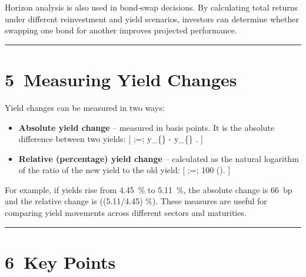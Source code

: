 \documentclass[
  letterpaper,
  DIV=11,
  numbers=noendperiod]{scrartcl}
\begin{document}
Horizon analysis is also used in bond‑swap decisions. By calculating
total returns under different reinvestment and yield scenarios,
investors can determine whether swapping one bond for another improves
projected performance.

\begin{center}\rule{0.5\linewidth}{0.5pt}\end{center}

\section{5~Measuring Yield Changes}\label{measuring-yield-changes}

Yield changes can be measured in two ways:

\begin{itemize}
\item
  \textbf{Absolute yield change} -- measured in basis points. It is the
  absolute difference between two yields: {[}
   ;=; \textbar y\_\{\} -
  y\_\{\}\textbar{} . {]}
\item
  \textbf{Relative (percentage) yield change} -- calculated as the
  natural logarithm of the ratio of the new yield to the old yield: {[}
   ;=; 100
  \times \ln\left(\right). {]}
\end{itemize}

For example, if yields rise from 4.45~\% to 5.11~\%, the absolute change
is 66~bp and the relative change is (\ln(5.11/4.45)
\%). These measures are useful for comparing yield
movements across different sectors and maturities.

\begin{center}\rule{0.5\linewidth}{0.5pt}\end{center}

\section{6~Key Points}\label{key-points}
\end{document}
